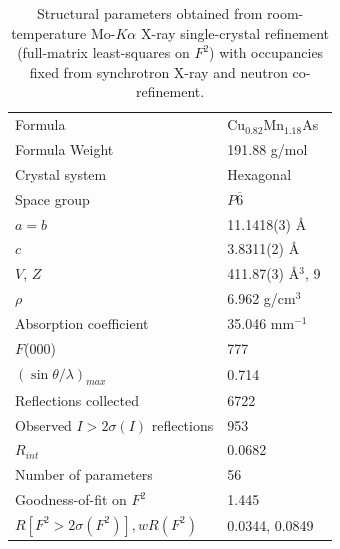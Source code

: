 \documentclass[10pt,doublespacing,edeposit]{uiucthesis2020}
\newcommand*{\cumnas}{Cu$_{0.82}$Mn$_{1.18}$As}
\begin{document}
\begin{mainmatter}

\begin{table}
\caption{\label{tab:sxtl} 
Structural parameters obtained from room-temperature Mo-$K\alpha$ X-ray
single-crystal refinement (full-matrix least-squares on $F^2$) with occupancies fixed from synchrotron X-ray and neutron co-refinement. 
}
\centering
\begin{tabular}{ll}
\hline
Formula								&  \cumnas\ \\
Formula Weight						& 191.88 g/mol\\
Crystal system						& Hexagonal \\
Space group							& $P\overline{6}$\\
$a=b$									& 11.1418(3) \AA \\
$c$									& 3.8311(2) \AA \\
$V$, $Z$ 								& 411.87(3) \AA$^3$, 9 \\
$\rho$ 								& 6.962 g/cm$^3$ \\
Absorption coefficient			& 35.046 mm$^{-1}$ \\
$F$(000) 							& 777 \\ 
$(\sin\theta/\lambda)_{max}$ 					& 0.714 \\
Reflections collected       	& 6722 \\
Observed $I>2\sigma(I)$ reflections       	& 953 \\
$R_{int}$							& 0.0682 \\
Number of parameters 			& 56 \\
Goodness-of-fit on $F^2$		& 1.445 \\
$R[F^2 > 2\sigma(F^2)], wR(F^2)$    &   0.0344, 0.0849 \\
\hline
\end{tabular}
~\\
\end{table}


\end{mainmatter}
\end{document}
